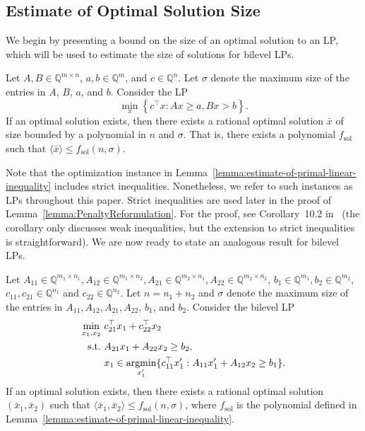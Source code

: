 \documentclass[runningheads,orivec]{llncs}
\newcommand{\MacroColor}[1]{#1}
\DeclareMathOperator*{\Argmin}{\MacroColor{argmin}}
\newcommand{\Size}[1]{\langle#1\rangle}
\newcommand{\SizeTwo}[2]{\langle#1,#2\rangle}
\newcommand{\ConstraintSense}{\MacroColor{\ge}}
\newcommand{\StrictConstraintSense}{\MacroColor{>}}
\newcommand{\NVariables}{\MacroColor{n}}
\newcommand{\NConstraints}{\MacroColor{m}}
\newcommand{\SolutionSizeEstimate}{\MacroColor{f_{\mathrm{sol}}}}
\newcommand{\EncodingSize}{size}
\begin{document}
\subsection{Estimate of Optimal Solution Size}
\label{subsec:EstimateOfOptimalSolutionSize}

We begin by presenting a bound on the size of an optimal solution to an LP, which will be used to estimate the size of solutions for bilevel LPs.
\begin{lemma}
\label{lemma:estimate-of-primal-linear-inequality}
Let $A, B \in \mathbb{Q}^{\NConstraints \times \NVariables}$, $a, b \in \mathbb{Q}^{\NConstraints}$, and $c \in \mathbb{Q}^{\NVariables}$.  
Let $\sigma$ denote the maximum \EncodingSize{} of the entries in $A$, $B$, $a$, and $b$.  
Consider the LP
\[
\min_{x} \left\{ c^{\top} x : A x \ConstraintSense a, B x \StrictConstraintSense b \right\}.
\]
If an optimal solution exists, then there exists a rational optimal solution $\bar{x}$ of size bounded by a polynomial in $\NVariables$ and $\sigma$.  
That is, there exists a polynomial $\SolutionSizeEstimate$ such that $\Size{\bar{x}} \le \SolutionSizeEstimate(\NVariables, \sigma)$.
\end{lemma}
Note that the optimization instance in Lemma~\ref{lemma:estimate-of-primal-linear-inequality} includes strict inequalities.
Nonetheless, we refer to such instances as LPs throughout this paper.
Strict inequalities are used later in the proof of Lemma~\ref{lemma:PenaltyReformulation}.
\label{Rev:MorePreciseReferenceToSchrijver}
For the proof, see Corollary~10.2 in~\cite{Schrijver1998} (the corollary only discusses weak inequalities, but the extension to strict inequalities is straightforward).
We are now ready to state an analogous result for bilevel LPs.
\begin{lemma}
\label{lemma:SolutionSizeEstimate}
Let
$A_{1 1} \in \mathbb{Q}^{\NConstraints_1 \times \NVariables_1}, A_{1 2} \in \mathbb{Q}^{\NConstraints_1 \times \NVariables_2}, A_{2 1} \in \mathbb{Q}^{\NConstraints_2 \times \NVariables_1}, A_{2 2} \in \mathbb{Q}^{\NConstraints_2 \times \NVariables_2}$, $b_1 \in \mathbb{Q}^{\NConstraints_1}, b_2 \in \mathbb{Q}^{\NConstraints_2}$, $c_{1 1}, c_{2 1} \in \mathbb{Q}^{\NVariables_1}$ and $c_{2 2} \in \mathbb{Q}^{\NVariables_2}$.
Let $\NVariables = \NVariables_1 + \NVariables_2$ and $\sigma$ denote the maximum \EncodingSize{} of the entries in $A_{1 1}, A_{1 2}, A_{2 1}, A_{2 2}$, $b_1$, and $b_2$.
Consider the bilevel LP
\begin{align}
\min_{x_1, x_2} \ &
c_{2 1}^{\top} x_1 + c_{2 2}^{\top} x_2
\label{eq:SolutionSizeEstimateBLP}
\\
\text{s.t.} \ &
A_{2 1} x_1 + A_{2 2} x_2 \ge b_2, \notag \\
&
x_1 \in \Argmin_{x_1'} \{ c_{1 1}^{\top} x_1' : A_{1 1} x_1' + A_{1 2} x_2 \ge b_1 \}. \notag
\end{align}
If an optimal solution exists, then there exists a rational optimal solution $(\bar{x}_1, \bar{x}_2)$ such that $\SizeTwo{\bar{x}_1}{\bar{x}_2} \le \SolutionSizeEstimate(\NVariables, \sigma)$, \label{Rev:DefOfFSol} where $\SolutionSizeEstimate$ is the polynomial defined in Lemma~\ref{lemma:estimate-of-primal-linear-inequality}.
\end{lemma}
\end{document}
